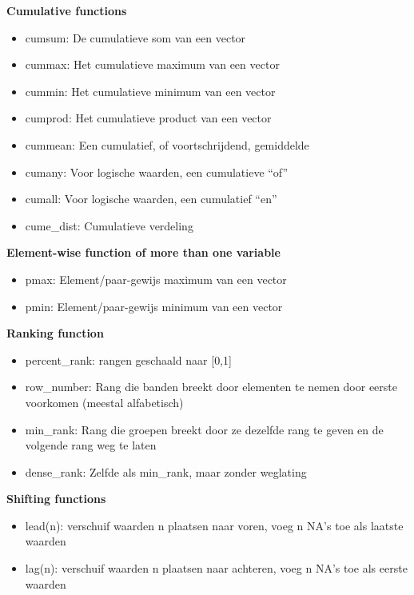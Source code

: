 \documentclass[]{tufte-book}
\providecommand{\tightlist}{%
  \setlength{\itemsep}{0pt}\setlength{\parskip}{0pt}}
\begin{document}
\textbf{Cumulative functions}

\begin{itemize}
\tightlist
\item
  cumsum: De cumulatieve som van een vector
\item
  cummax: Het cumulatieve maximum van een vector
\item
  cummin: Het cumulatieve minimum van een vector
\item
  cumprod: Het cumulatieve product van een vector
\item
  cummean: Een cumulatief, of voortschrijdend, gemiddelde
\item
  cumany: Voor logische waarden, een cumulatieve ``of''
\item
  cumall: Voor logische waarden, een cumulatief ``en''
\item
  cume\_dist: Cumulatieve verdeling
\end{itemize}

\textbf{Element-wise function of more than one variable}

\begin{itemize}
\tightlist
\item
  pmax: Element/paar-gewijs maximum van een vector
\item
  pmin: Element/paar-gewijs minimum van een vector
\end{itemize}

\textbf{Ranking function}

\begin{itemize}
\tightlist
\item
  percent\_rank: rangen geschaald naar {[}0,1{]}
\item
  row\_number: Rang die banden breekt door elementen te nemen door eerste voorkomen (meestal alfabetisch)
\item
  min\_rank: Rang die groepen breekt door ze dezelfde rang te geven en de volgende rang weg te laten
\item
  dense\_rank: Zelfde als min\_rank, maar zonder weglating
\end{itemize}

\textbf{Shifting functions}

\begin{itemize}
\tightlist
\item
  lead(n): verschuif waarden n plaatsen naar voren, voeg n NA's toe als laatste waarden
\item
  lag(n): verschuif waarden n plaatsen naar achteren, voeg n NA's toe als eerste waarden
\end{itemize}
\end{document}

